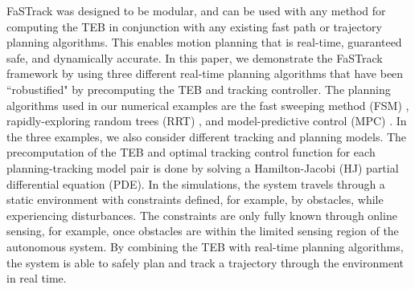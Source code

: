 FaSTrack was designed to be modular, and can be used with any method for computing the TEB in conjunction with any existing fast path or trajectory planning algorithms.  
This enables motion planning that is real-time, guaranteed safe, and dynamically accurate. 
In this paper, we demonstrate the FaSTrack framework by using three different real-time planning algorithms that have been ``robustified" by precomputing the TEB and tracking controller. 
The planning algorithms used in our numerical examples are the fast sweeping method (FSM) \cite{Takei2013}, rapidly-exploring random trees (RRT) \cite{Kuffner2000,Kavraki1996}, and model-predictive control (MPC) \cite{Qin2003}. 
In the three examples, we also consider different tracking and planning models.
The precomputation of the TEB and optimal tracking control function for each planning-tracking model pair is done by solving a Hamilton-Jacobi (HJ) partial differential equation (PDE). 
In the simulations, the system travels through a static environment with constraints defined, for example, by obstacles, while experiencing disturbances.
The constraints are only fully known through online sensing, for example, once obstacles are within the limited sensing region of the autonomous system. 
By combining the TEB with real-time planning algorithms, the system is able to safely plan and track a trajectory through the environment in real time. 
